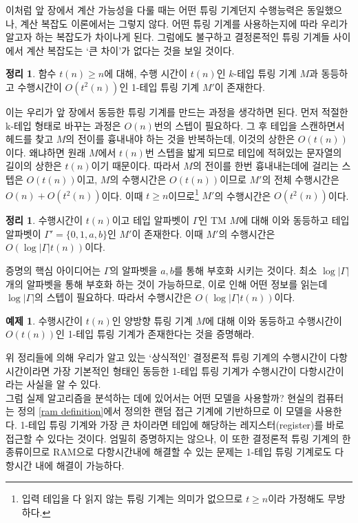 \documentclass[b5paper, 11pt]{book}
\theoremstyle{definition}
\newtheorem{thm}[defn]{정리}
\newtheorem{ex}[defn]{예제}
\newenvironment{pf*}{\pushQED{\qed}\pf}
{\popQED\endpf}
\begin{document}
이처럼 앞 장에서 계산 가능성을 다룰 때는 어떤 튜링 기계던지 수행능력은 동일했으나, 계산
복잡도 이론에서는 그렇지 않다. 어떤 튜링 기계를 사용하는지에 따라 우리가 알고자 하는 복잡도가
차이나게 된다. 그럼에도 불구하고 결정론적인 튜링 기계들 사이에서 계산 복잡도는 `큰 차이'가
없다는 것을 보일 것이다. 
\begin{thm} \label{t^2(n)}
    함수 $t(n) \ge n$에 대해, 수행 시간이 $t(n)$인 $k$-테입 튜링 기계 $M$과 동등하고 수행시간이 $O\left(t^2(n)\right)$인 1-테입 튜링 기계 $M'$이 존재한다. 
\end{thm}
\begin{pf*}
    이는 우리가 앞 장에서 동등한 튜링 기계를 만드는 과정을 생각하면 된다. 먼저 적절한 k-테입 형태로 바꾸는 과정은 $O(n)$번의 스텝이 필요하다. 그 후 테입을 스캔하면서 헤드를 찾고 $M$의 전이를 흉내내야 하는 것을 반복하는데, 이것의 상한은 $O(t(n))$이다. 왜냐하면 원래 $M$에서 $t(n)$번 스텝을 밟게 되므로 테입에 적혀있는 문자열의 길이의 상한은 $t(n)$이기 때문이다. 따라서 $M$의 전이를 한번 흉내내는데에 걸리는 스텝은 $O(t(n))$이고, $M$의 수행시간은 $O(t(n))$이므로 $M'$의 전체 수행시간은 $O(n) + O(t^2(n))$이다. 이때 $t \ge n$이므로\footnote{입력 테입을 다 읽지 않는 튜링 기계는 의미가 없으므로 $t\ge n$이라 가정해도 무방하다.} $M'$의  수행시간은 $O(t^2(n))$이다.
\end{pf*}
\begin{thm}
    수행시간이 $t(n)$이고 테입 알파벳이 $\Gamma$인 TM $M$에 대해 이와 동등하고 테입 알파벳이 $\Gamma' = \{0,1,a,b\}$인 $M'$이 존재한다. 이때 $M'$의 수행시간은 $O(\log\vert\Gamma\vert t(n))$이다. 
\end{thm}
\begin{pf*}
    증명의 핵심 아이디어는 $\Gamma$의 알파벳을 $a, b$를 통해 부호화 시키는 것이다. 최소 $\log
    \vert\Gamma\vert$개의 알파벳을 통해 부호화 하는 것이 가능하므로, 이로 인해 어떤 정보를 읽는데
    $\log\vert\Gamma\vert$의 스텝이 필요하다. 따라서 수행시간은 $O(\log\vert\Gamma\vert t(n))$이다.
\end{pf*}
\begin{ex}
    수행시간이 $t(n)$인 양방향 튜링 기계 $M$에 대해 이와 
    동등하고 수행시간이 $O(t(n))$인 1-테입 튜링 기계가 존재한다는 것을 증명해라.
\end{ex}
위 정리들에 의해 우리가 알고 있는 `상식적인' 결정론적 튜링 기계의 수행시간이 다항시간이라면 가장 기본적인 형태인 동등한 1-테입 튜링 기계가 수행시간이 다항시간이라는 사실을 알 수 있다.\\ 
그럼 실제 알고리즘을 분석하는 데에 있어서는 어떤 모델을 사용할까? 현실의 컴퓨터는 정의 \ref{ram definition}에서 정의한 랜덤 접근 기계에 기반하므로 이 모델을 사용한다. 1-테입 튜링 기계와 가장 큰 차이라면 테입에 해당하는 레지스터(register)를 바로 접근할 수 있다는 것이다. 엄밀히 증명하지는 않으나, 이 또한 결정론적 튜링 기계의 한 종류이므로 RAM으로 다항시간내에 해결할 수 있는 문제는 1-테입 튜링 기계로도 다항시간 내에 해결이 가능하다.
\end{document}
